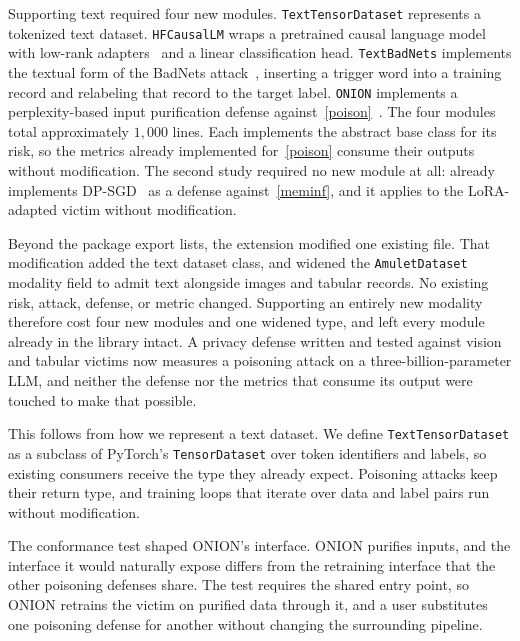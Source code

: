 Supporting text required four new modules.
\texttt{TextTensorDataset} represents a tokenized text dataset.
\texttt{HFCausalLM} wraps a pretrained causal language model with low-rank adapters~\cite{hu2021LoRALowRankAdaptation} and a linear classification head.
\texttt{TextBadNets} implements the textual form of the BadNets attack~\cite{gu2019BadNetsEvaluatingBackdooring}, inserting a trigger word into a training record and relabeling that record to the target label.
\texttt{ONION} implements a perplexity-based input purification defense against~\ref{poison}~\cite{qi2021ONIONSimpleEffective}.
The four modules total approximately $1{,}000$ lines.
Each implements the abstract base class for its risk, so the metrics already implemented for~\ref{poison} consume their outputs without modification.
The second study required no new module at all: \method already implements DP-SGD~\cite{abadi2016DeepLearningDifferential} as a defense against~\ref{meminf}, and it applies to the LoRA-adapted victim without modification.

Beyond the package export lists, the extension modified one existing file.
That modification added the text dataset class, and widened the \texttt{AmuletDataset} modality field to admit text alongside images and tabular records.
No existing risk, attack, defense, or metric changed.
Supporting an entirely new modality therefore cost four new modules and one widened type, and left every module already in the library intact.
A privacy defense written and tested against vision and tabular victims now measures a poisoning attack on a three-billion-parameter LLM, and neither the defense nor the metrics that consume its output were touched to make that possible.

This follows from how we represent a text dataset.
We define \texttt{TextTensorDataset} as a subclass of PyTorch's \texttt{TensorDataset} over token identifiers and labels, so existing consumers receive the type they already expect.
Poisoning attacks keep their return type, and training loops that iterate over data and label pairs run without modification.

The conformance test shaped ONION's interface.
ONION purifies inputs, and the interface it would naturally expose differs from the retraining interface that the other poisoning defenses share.
The test requires the shared entry point, so ONION retrains the victim on purified data through it, and a user substitutes one poisoning defense for another without changing the surrounding pipeline.

